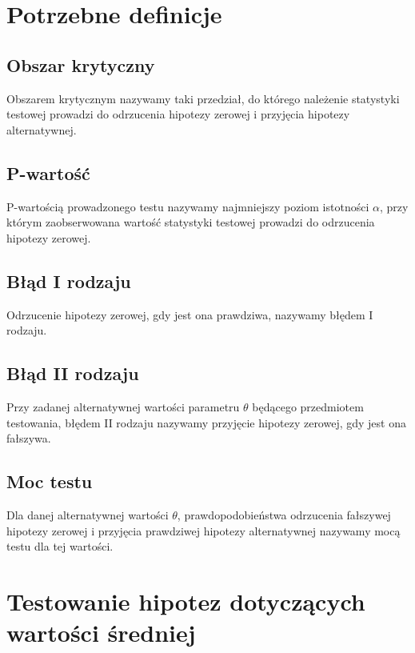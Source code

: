 \documentclass[12pt]{mwart}
\begin{document}
	\section{Potrzebne definicje}
	\subsection{Obszar krytyczny}
	\noindent Obszarem krytycznym nazywamy taki przedział, do którego należenie statystyki testowej prowadzi do odrzucenia hipotezy zerowej i przyjęcia hipotezy alternatywnej.
	\subsection{P-wartość}
	\noindent P-wartością prowadzonego testu nazywamy najmniejszy poziom istotności $\alpha$, przy którym zaobserwowana wartość statystyki testowej prowadzi do odrzucenia hipotezy zerowej.
	\subsection{Błąd I rodzaju}
	\noindent Odrzucenie hipotezy zerowej, gdy jest ona prawdziwa, nazywamy błędem I rodzaju.
	\subsection{Błąd II rodzaju}
	\noindent Przy zadanej alternatywnej wartości parametru $\theta$ będącego przedmiotem testowania, błędem II rodzaju nazywamy przyjęcie hipotezy zerowej, gdy jest ona fałszywa.
	\subsection{Moc testu}
	\noindent Dla danej alternatywnej wartości $\theta$, prawdopodobieństwa odrzucenia fałszywej hipotezy zerowej i przyjęcia prawdziwej hipotezy alternatywnej nazywamy mocą testu dla tej wartości.
	
	
	
	\section{Testowanie hipotez dotyczących wartości średniej}
	
\end{document}

